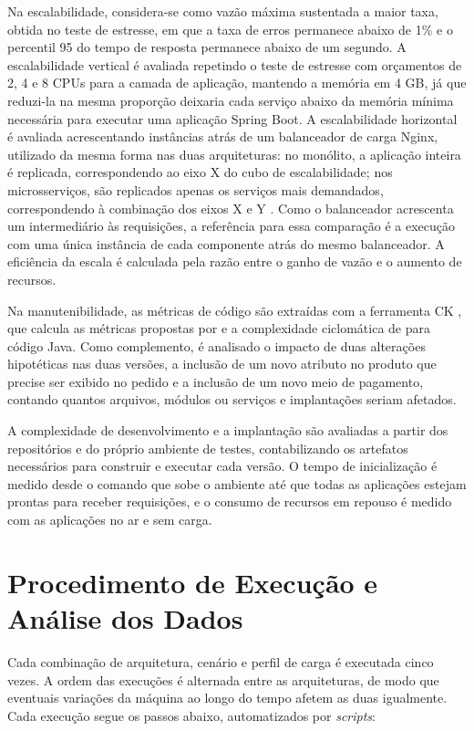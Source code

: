 Na escalabilidade, considera-se como vazão máxima sustentada a maior taxa, obtida no teste de
estresse, em que a taxa de erros permanece abaixo de 1\% e o percentil 95 do tempo de resposta
permanece abaixo de um segundo. A escalabilidade vertical é avaliada repetindo o teste de
estresse com orçamentos de 2, 4 e 8 CPUs para a camada de aplicação, mantendo a memória em
4 GB, já que reduzi-la na mesma proporção deixaria cada serviço abaixo da memória mínima
necessária para executar uma aplicação Spring Boot. A escalabilidade horizontal é avaliada
acrescentando instâncias atrás de um balanceador de carga Nginx, utilizado da mesma forma nas
duas arquiteturas: no monólito, a aplicação inteira é replicada, correspondendo ao eixo X do
cubo de escalabilidade; nos microsserviços, são replicados apenas os serviços mais demandados,
correspondendo à combinação dos eixos X e Y \cite{abbott2015}. Como o balanceador acrescenta
um intermediário às requisições, a referência para essa comparação é a execução com uma única
instância de cada componente atrás do mesmo balanceador. A eficiência da escala é calculada
pela razão entre o ganho de vazão e o aumento de recursos.

Na manutenibilidade, as métricas de código são extraídas com a ferramenta CK
\cite{aniche-ck}, que calcula as métricas propostas por  e a
complexidade ciclomática de  para código Java. Como complemento, é
analisado o impacto de duas alterações hipotéticas nas duas versões, a inclusão de um novo
atributo no produto que precise ser exibido no pedido e a inclusão de um novo meio de
pagamento, contando quantos arquivos, módulos ou serviços e implantações seriam afetados.

A complexidade de desenvolvimento e a implantação são avaliadas a partir dos repositórios e do
próprio ambiente de testes, contabilizando os artefatos necessários para construir e executar
cada versão. O tempo de inicialização é medido desde o comando que sobe o ambiente até que
todas as aplicações estejam prontas para receber requisições, e o consumo de recursos em
repouso é medido com as aplicações no ar e sem carga.

\section{Procedimento de Execução e Análise dos Dados}

Cada combinação de arquitetura, cenário e perfil de carga é executada cinco vezes. A ordem das
execuções é alternada entre as arquiteturas, de modo que eventuais variações da máquina ao
longo do tempo afetem as duas igualmente. Cada execução segue os passos abaixo, automatizados
por \textit{scripts}:

